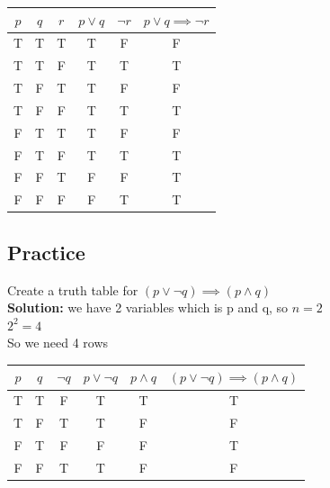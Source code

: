 \documentclass{article}
\begin{document}
\begin{enumerate}
		\begin{tabular}{|c|c|c|c|c|c|}
			\hline
			$ p $ & $ q $ & $ r $ & $ p \lor q $ & $ \neg r $ & $ p \lor q \implies \neg r $\\
			\hline
			T & T & T & T & F & F\\
			T & T & F & T & T & T\\
			T & F & T & T & F & F\\
			T & F & F & T & T & T\\
			F & T & T & T & F & F\\
			F & T & F & T & T & T\\
			F & F & T & F & F & T\\
			F & F & F & F & T & T\\
			\hline
		\end{tabular}
\end{enumerate}
\subsection{Practice}
Create a truth table for $(p \lor \neg q) \implies (p \land q)$ \\


\textbf{Solution:}
we have 2 variables which is p and q, so $ n = 2 $\\
$2^2 = 4$\\
So we need 4 rows \\


\begin{tabular}{|c|c|c|c|c|c|}
	\hline
	$ p $ & $ q $ & $ \neg q $ & $ p \lor \neg q $ & $ p \land q $ & $(p \lor \neg q) \implies (p \land q)$ \\
	\hline
	T & T & F & T & T & T \\
	T & F & T & T & F & F \\
	F & T & F & F & F & T \\
	F & F & T & T & F & F \\
	\hline
\end{tabular}
\end{document}
